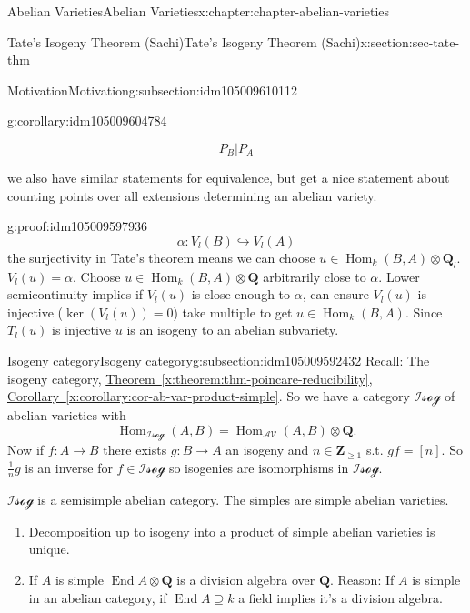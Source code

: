 \documentclass[oneside,10pt,]{book}
\numberwithin{equation}{section}
\newcommand{\lb}{[}
\newcommand{\rb}{]}
\newcommand{\ZZ}{\mathbf{Z}}
\newcommand{\QQ}{\mathbf{Q}}
\newcommand{\cat}[1]{\mathcal{#1}}
\DeclareMathOperator{\End}{End}
\DeclareMathOperator{\Hom}{Hom}
\begin{document}
\begin{chapterptx}{Abelian Varieties}{}{Abelian Varieties}{}{}{x:chapter:chapter-abelian-varieties}
\begin{sectionptx}{Tate's Isogeny Theorem (Sachi)}{}{Tate's Isogeny Theorem (Sachi)}{}{}{x:section:sec-tate-thm}
\begin{subsectionptx}{Motivation}{}{Motivation}{}{}{g:subsection:idm105009610112}
\begin{corollary}{}{}{g:corollary:idm105009604784}
\begin{enumerate}
\begin{enumerate}
\begin{equation*}
P_B | P_A
\end{equation*}
%
\end{enumerate}
%
\end{enumerate}
we also have similar statements for equivalence, but get a nice statement about counting points over all extensions determining an abelian variety.%
\end{corollary}
\begin{proofptx}{}{g:proof:idm105009597936}
%
\begin{equation*}
\alpha \colon V_l(B)\hookrightarrow V_l(A)
\end{equation*}
the surjectivity in Tate's theorem means we can choose \(u \in \Hom_k(B,A) \otimes \QQ_l\). \(V_l(u) = \alpha\). Choose \(u \in \Hom_k(B,A) \otimes \QQ\) arbitrarily close to \(\alpha\). Lower semicontinuity implies if \(V_l(u)\) is close enough to \(\alpha\), can ensure \(V_l(u)\) is injective (\(\ker (V_l (u)) = 0\)) take multiple to get \(u \in \Hom_k(B,A)\). Since \(T_l (u)\) is injective \(u \) is an isogeny to an abelian subvariety.%
\end{proofptx}
\end{subsectionptx}
%
%
\typeout{************************************************}
\typeout{************************************************}
%
\begin{subsectionptx}{Isogeny category}{}{Isogeny category}{}{}{g:subsection:idm105009592432}
Recall: The isogeny category, \hyperref[x:theorem:thm-poincare-reducibility]{Theorem~\ref{x:theorem:thm-poincare-reducibility}}, \hyperref[x:corollary:cor-ab-var-product-simple]{Corollary~\ref{x:corollary:cor-ab-var-product-simple}}. So we have  a category \(\cat{Isog}\) of abelian varieties with%
\begin{equation*}
\Hom_{\cat{Isog}}(A,B) = \Hom_\cat{AV}(A,B)\otimes \QQ\text{.}
\end{equation*}
Now if \(f \colon A \to B\) there exists \(g\colon B \to A\) an isogeny and \(n\in \ZZ_{\ge 1}\) s.t. \(gf = \lb n \rb\). So \(\frac 1n g\) is an inverse for \(f \in \cat{Isog}\) so isogenies are isomorphisms in \(\cat{Isog}\).%
\par
\(\cat{Isog}\) is a semisimple abelian category. The simples are simple abelian varieties.%
\begin{enumerate}
\item{}Decomposition up to isogeny into a product of simple abelian varieties is unique.%
\item{}If \(A\) is simple \(\End A \otimes \QQ\) is a division algebra over \(\QQ\). Reason: If \(A\) is simple in an abelian category, if \(\End A \supseteq k\) a field implies it's a division algebra.%

\end{enumerate}
\end{subsectionptx}
\end{sectionptx}
\end{chapterptx}
\end{document}
